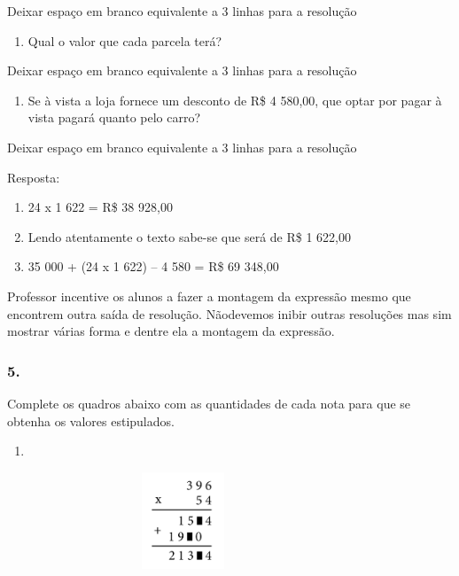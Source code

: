 Deixar espaço em branco equivalente a 3 linhas para a resolução

\begin{enumerate}
\def\labelenumi{\alph{enumi})}
\item
  Qual o valor que cada parcela terá?
\end{enumerate}

Deixar espaço em branco equivalente a 3 linhas para a resolução

\begin{enumerate}
\def\labelenumi{\alph{enumi})}
\item
  Se à vista a loja fornece um desconto de R\$ 4 580,00, que optar por
  pagar à vista pagará quanto pelo carro?
\end{enumerate}

Deixar espaço em branco equivalente a 3 linhas para a resolução

Resposta:

\begin{enumerate}
\def\labelenumi{\alph{enumi})}
\item
  24 x 1 622 = R\$ 38 928,00
\item
  Lendo atentamente o texto sabe-se que será de R\$ 1 622,00
\item
  35 000 + (24 x 1 622) -- 4 580 = R\$ 69 348,00
\end{enumerate}

Professor incentive os alunos a fazer a montagem da expressão mesmo que
encontrem outra saída de resolução. Nãodevemos inibir outras resoluções
mas sim mostrar várias forma e dentre ela a montagem da expressão.

\subsubsection{5.}\label{section-69}

Complete os quadros abaixo com as quantidades de cada nota para que se
obtenha os valores estipulados.

\begin{enumerate}
\def\labelenumi{\alph{enumi})}
\item
\end{enumerate}

\includegraphics[width=4.14203in,height=1.14177in]{media/image83.png}

